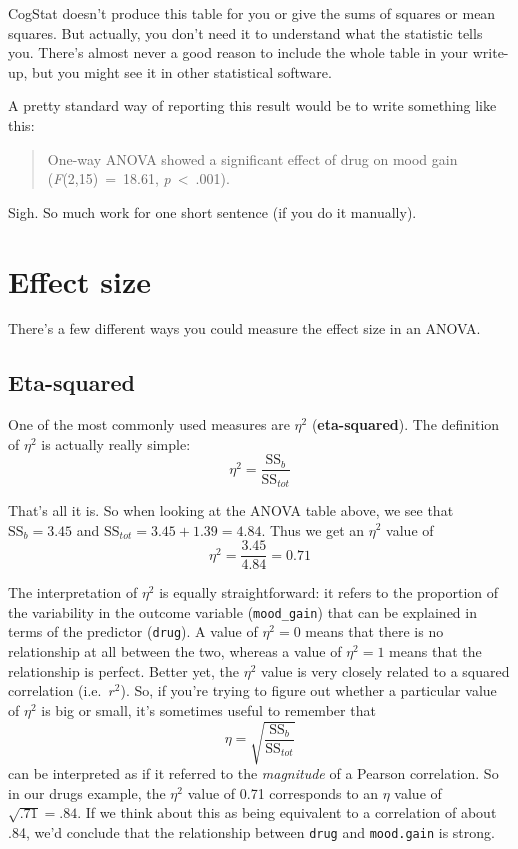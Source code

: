 \documentclass[
  11pt,
  a4paper,
  twoside,symmetric,openright]{book}
\theoremstyle{break}
\theoremstyle{break}
\begin{document}
CogStat doesn't produce this table for you or give the sums of squares or mean squares. But actually, you don't need it to understand what the statistic tells you. There's almost never a good reason to include the whole table in your write-up, but you might see it in other statistical software.

A pretty standard way of reporting this result would be to write something like this:

\begin{quote}
One-way ANOVA showed a significant effect of drug on mood gain (\emph{F}(2,15)~=~18.61, \emph{p}~\textless~.001).
\end{quote}

Sigh. So much work for one short sentence (if you do it manually).

\section{Effect size}\label{anovaeffect}

There's a few different ways you could measure the effect size in an ANOVA.

\subsection{Eta-squared}\label{eta-squared}

One of the most commonly used measures are \(\eta^2\) (\textbf{eta-squared}). The definition of \(\eta^2\) is actually really simple:
\[
\eta^2 = \frac{\mbox{SS}_b}{\mbox{SS}_{tot}}
\]

That's all it is. So when looking at the ANOVA table above, we see that \(\mbox{SS}_b = 3.45\) and \(\mbox{SS}_{tot} = 3.45 + 1.39 = 4.84\). Thus we get an \(\eta^2\) value of
\[
\eta^2 = \frac{3.45}{4.84} = 0.71
\]

The interpretation of \(\eta^2\) is equally straightforward: it refers to the proportion of the variability in the outcome variable (\texttt{mood\_gain}) that can be explained in terms of the predictor (\texttt{drug}). A value of \(\eta^2 = 0\) means that there is no relationship at all between the two, whereas a value of \(\eta^2 = 1\) means that the relationship is perfect. Better yet, the \(\eta^2\) value is very closely related to a squared correlation (i.e.~\(r^2\)). So, if you're trying to figure out whether a particular value of \(\eta^2\) is big or small, it's sometimes useful to remember that
\[
\eta= \sqrt{\frac{\mbox{SS}_b}{\mbox{SS}_{tot}}}
\]
can be interpreted as if it referred to the \emph{magnitude} of a Pearson correlation. So in our drugs example, the \(\eta^2\) value of 0.71 corresponds to an \(\eta\) value of \(\sqrt{.71} = .84\). If we think about this as being equivalent to a correlation of about .84, we'd conclude that the relationship between \texttt{drug} and \texttt{mood.gain} is strong.
\end{document}
